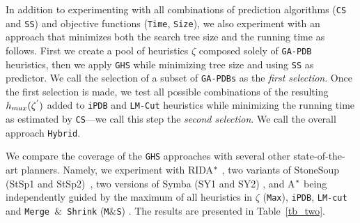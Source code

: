 In addition to experimenting with all combinations of prediction algorithms (\texttt{CS} and \texttt{SS}) and objective functions (\texttt{Time}, \texttt{Size}), we also experiment with an approach that minimizes both the search tree size and the running time as follows. First we create a pool of heuristics $\zeta$ composed solely of \texttt{GA-PDB} heuristics, then we apply \texttt{GHS} while minimizing tree size and using \texttt{SS} as predictor. We call the selection of a subset of \texttt{GA-PDBs} as the \textit{first selection}. Once the first selection is made, we test all possible combinations of the resulting $h_{max}(\zeta\sp{'})$ added to \texttt{iPDB} and \texttt{LM-Cut} heuristics while minimizing the running time as estimated by \texttt{CS}---we call this step the \textit{second selection}. We call the overall approach \texttt{Hybrid}.


We compare the coverage of the \texttt{GHS} approaches with several other state-of-the-art planners. Namely, we experiment with RIDA$\sp{*}$ \cite{BarleySantiagoOver}, two variants of StoneSoup (StSp1 and StSp2)~\cite{HelmertRK11}, two versions of Symba (SY1 and SY2) \cite{torralba2015phd}, and A$\sp{*}$ being independently guided by the maximum of all heuristics in $\zeta$ (\texttt{Max}), \texttt{iPDB}, \texttt{LM-cut} and \texttt{Merge $\&$ Shrink} (\texttt{M$\&$S}) \cite{nissim2011computing}. The results are presented in Table~\ref{tb_two}.


